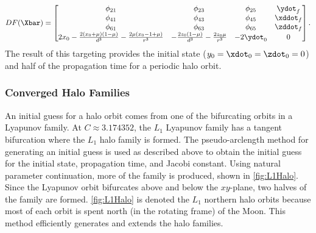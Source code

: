 \begin{equation}
    DF(\Xbar)=\begin{bmatrix}   \phi_{21}                                                                   &   \phi_{23}                                               &   \phi_{25}                                   &   \ydot_{f}                               \\
                                \phi_{41}                                                                   &   \phi_{43}                                               &   \phi_{45}                                   &   \xddot_{f}                              \\
                                \phi_{61}                                                                   &   \phi_{63}                                               &   \phi_{65}                                   &   \zddot_{f}                              \\
                                2x_{0}-\frac{2(x_{0}+\mu)(1-\mu)}{d^{3}}-\frac{2\mu(x_{0}-1+\mu)}{r^{3}}    &   -\frac{2z_{0}(1-\mu)}{d^{3}}-\frac{2z_{0}\mu}{r^{3}}    &   -2\ydot_{0}                                 &   0                                       \end{bmatrix}.
    \label{eq:halojacobian}
\end{equation}
The result of this targeting provides the initial state ($y_{0}=\xdot_{0}=\zdot_{0}=0$) and half of
the propagation time for a periodic halo orbit.

\subsubsection{Converged Halo Families}
An initial guess for a halo orbit comes from one of the bifurcating orbits in a Lyapunov family. At
$C\approx3.174352$, the $L_{1}$ Lyapunov family has a tangent bifurcation where the $L_{1}$ halo
family is formed. The pseudo-arclength method for generating an initial guess is used as described
above to obtain the initial guess for the initial state, propagation time, and Jacobi constant.
Using natural parameter continuation, more of the family is produced, shown in \cref{fig:L1Halo}.
Since the Lyapunov orbit bifurcates above and below the $xy$-plane, two halves of the family are
formed. \cref{fig:L1Halo} is denoted the $L_{1}$ northern halo orbits because most of each orbit is
spent north (in the rotating frame) of the Moon. This method efficiently generates and extends the
halo families.

